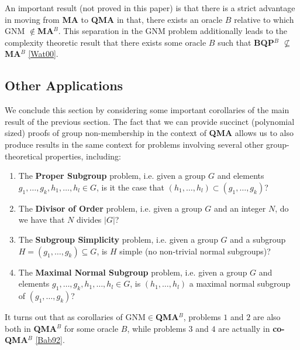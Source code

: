 \documentclass[12pt]{article}
\numberwithin{thm}{section}
\numberwithin{defn}{section}
\numberwithin{prop}{section}
\numberwithin{rmk}{section}
\begin{document}
	An important result (not proved in this paper) is that there is a strict advantage in moving from \textbf{MA} to \textbf{QMA} in that, there exists an oracle $B$ relative to which GNM $\notin$\textbf{MA$^B$}. This separation in the GNM problem additionally leads to the complexity theoretic result that there exists some oracle $B$ such that \textbf{BQP$^B$} $\not\subseteq$ \textbf{MA$^B$} \hyperref[wat00]{[Wat00]}.  
    \subsection{Other Applications}
    We conclude this section by considering some important corollaries of the main result of the previous section. The fact that we can provide succinct (polynomial sized) proofs of group non-membership in the context of \textbf{QMA} allows us to also produce results in the same context for problems involving several other group-theoretical properties, including:
    \begin{enumerate}
    	\item The \textbf{Proper Subgroup} problem, i.e. given a group $G$ and elements $g_1,\dots,g_k,h_1,\dots,h_l\in G$, is it the case that $(h_1,\dots,h_l)\subset(g_1,\dots,g_k)$?
    	\item The \textbf{Divisor of Order} problem, i.e. given a group $G$ and an integer $N$, do we have that $N$ divides $|G|$?
    	\item The \textbf{Subgroup Simplicity} problem, i.e. given a group $G$ and a subgroup $H=(g_1,\dots,g_k)\subseteq G$, is $H$ simple (no non-trivial normal subgroups)?
    	\item  The \textbf{Maximal Normal Subgroup} problem, i.e. given a group $G$ and elements $g_1,\dots,g_k,h_1,\dots,h_l\in G$, is $(h_1,\dots,h_l)$ a maximal normal subgroup of $(g_1,\dots,g_k)$? 
    \end{enumerate}
	It turns out that as corollaries of GNM$\in$\textbf{QMA$^B$}, problems $1$ and $2$ are also both in \textbf{QMA$^B$} for some oracle $B$, while problems $3$ and $4$ are actually in \textbf{co-QMA$^B$} \hyperref[bab92]{[Bab92]}.
\end{document}
